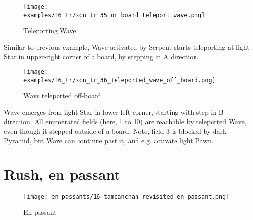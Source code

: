 \clearpage %

\vspace*{-1.0\baselineskip}
\noindent
\begin{figure}[!h]
\texttt{[image: examples/16\_tr/scn\_tr\_35\_on\_board\_teleport\_wave.png]}
\caption{Teleporting Wave}
\label{fig:scn_tr_35_on_board_teleport_wave}
\end{figure}

Similar to previous example, Wave activated by Serpent starts teleporting at
light Star in upper-right corner of a board, by stepping in A direction.

\clearpage %

\vspace*{-1.0\baselineskip}
\noindent
\begin{figure}[!h]
\texttt{[image: examples/16\_tr/scn\_tr\_36\_teleported\_wave\_off\_board.png]}
\caption{Wave teleported off-board}
\label{fig:scn_tr_36_teleported_wave_off_board}
\end{figure}

Wave emerges from light Star in lower-left corner, starting with step in B
direction. All enumerated fields (here, 1 to 10) are reachable by teleported
Wave, even though it stepped outside of a board. Note, field 3 is blocked by
dark Pyramid, but Wave can continue past it, and e.g. activate light Pawn.

\clearpage %

\section*{Rush, en passant}
\label{sec:Tamoanchan Revisited/Rush, en passant}

\vspace*{-1.2\baselineskip}
\noindent
\begin{figure}[!h]
\texttt{[image: en\_passants/16\_tamoanchan\_revisited\_en\_passant.png]}
\caption{En passant}
\label{fig:16_tamoanchan_revisited_en_passant}
\end{figure}

